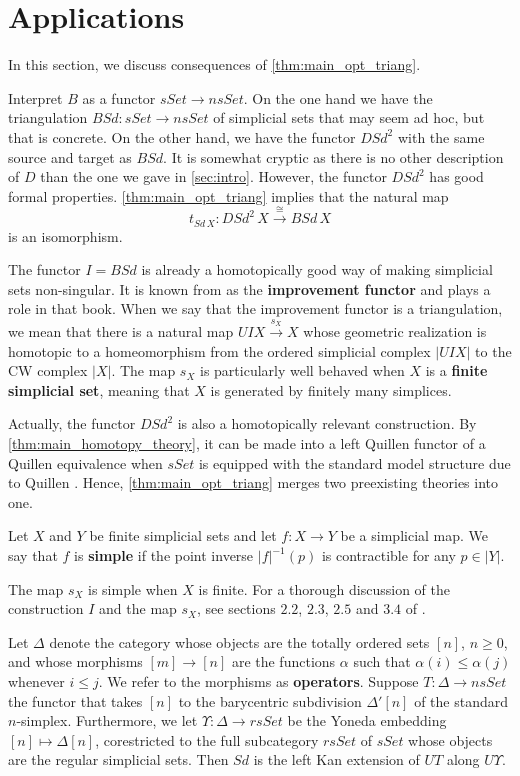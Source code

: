 
\section{Applications}
\label{sec:conseq}

In this section, we discuss consequences of \cref{thm:main_opt_triang}.

Interpret $B$ as a functor $sSet\to nsSet$. On the one hand we have the triangulation $BSd:sSet\to nsSet$ of simplicial sets that may seem ad hoc, but that is concrete. On the other hand, we have the functor $DSd^2$ with the same source and target as $BSd$. It is somewhat cryptic as there is no other description of $D$ than the one we gave in \cref{sec:intro}. However, the functor $DSd^2$ has good formal properties. \cref{thm:main_opt_triang} implies that the natural map
\[t_{Sd\, X}:DSd^2\, X\xrightarrow{\cong } BSd\, X\]
is an isomorphism.

The functor $I=BSd$ is already a homotopically good way of making simplicial sets non-singular. It is known from \cite[§2.5]{WJR13} as the \textbf{improvement functor} and plays a role in that book. When we say that the improvement functor is a triangulation, we mean that there is a natural map $UIX\xrightarrow{s_X} X$ whose geometric realization is homotopic to a homeomorphism from the ordered simplicial complex $\lvert UIX\rvert$ to the CW complex $\lvert X\rvert$. The map $s_X$ is particularly well behaved when $X$ is a \textbf{finite simplicial set}, meaning that $X$ is generated by finitely many simplices.

Actually, the functor $DSd^2$ is also a homotopically relevant construction. By \cref{thm:main_homotopy_theory}, it can be made into a left Quillen functor of a Quillen equivalence when $sSet$ is equipped with the standard model structure due to Quillen \cite{Qu67}. Hence, \cref{thm:main_opt_triang} merges two preexisting theories into one.
\begin{definition}\label{def:simple_map_calculating_dsd2}
Let $X$ and $Y$ be finite simplicial sets and let $f:X\to Y$ be a simplicial map. We say that $f$ is \textbf{simple} if the point inverse $\lvert f\rvert ^{-1}(p)$ is contractible for any $p\in \lvert Y\rvert$.
\end{definition}
\noindent The map $s_X$ is simple when $X$ is finite. For a thorough discussion of the construction $I$ and the map $s_X$, see sections $2.2$, $2.3$, $2.5$ and $3.4$ of \cite{WJR13}.

Let $\Delta$ denote the category whose objects are the totally ordered sets $[n]$, $n\geq 0$, and whose morphisms $[m]\to [n]$ are the functions $\alpha$ such that $\alpha (i)\leq \alpha (j)$ whenever $i\leq j$. We refer to the morphisms as \textbf{operators}. Suppose $T:\Delta \to nsSet$ the functor that takes $[n]$ to the barycentric subdivision $\Delta '[n]$ of the standard $n$-simplex. Furthermore, we let $\Upsilon :\Delta \to rsSet$ be the Yoneda embedding $[n]\mapsto \Delta [n]$, corestricted to the full subcategory $rsSet$ of $sSet$ whose objects are the regular simplicial sets. Then $Sd$ is the left Kan extension of $UT$ along $U\Upsilon$.

